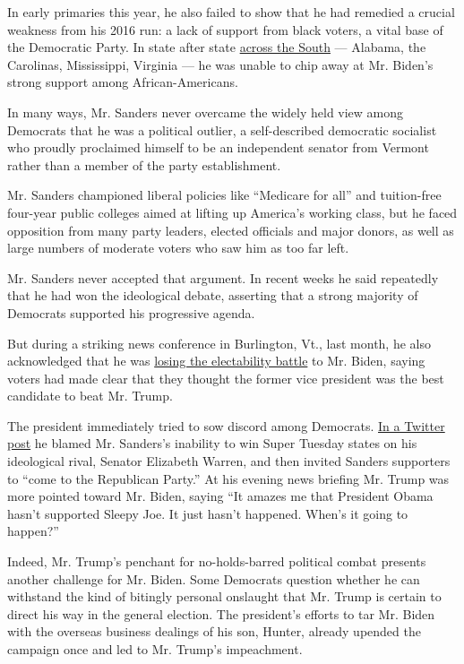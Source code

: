 In early primaries this year, he also failed to show that he had
remedied a crucial weakness from his 2016 run: a lack of support from
black voters, a vital base of the Democratic Party. In state after state
\href{https://www.nytimes.com/2020/03/04/us/politics/super-tuesday-virginia-voter-turnout.html}{across
the South} --- Alabama, the Carolinas, Mississippi, Virginia --- he was
unable to chip away at Mr. Biden's strong support among
African-Americans.

In many ways, Mr. Sanders never overcame the widely held view among
Democrats that he was a political outlier, a self-described democratic
socialist who proudly proclaimed himself to be an independent senator
from Vermont rather than a member of the party establishment.

Mr. Sanders championed liberal policies like ``Medicare for all'' and
tuition-free four-year public colleges aimed at lifting up America's
working class, but he faced opposition from many party leaders, elected
officials and major donors, as well as large numbers of moderate voters
who saw him as too far left.

Mr. Sanders never accepted that argument. In recent weeks he said
repeatedly that he had won the ideological debate, asserting that a
strong majority of Democrats supported his progressive agenda.

But during a striking news conference in Burlington, Vt., last month, he
also acknowledged that he was
\href{https://www.nytimes.com/2020/03/11/us/politics/bernie-sanders-democrats-2020.html}{losing
the electability battle} to Mr. Biden, saying voters had made clear that
they thought the former vice president was the best candidate to beat
Mr. Trump.

The president immediately tried to sow discord among Democrats.
\href{https://twitter.com/realDonaldTrump/status/1247914464319504385}{In
a Twitter post} he blamed Mr. Sanders's inability to win Super Tuesday
states on his ideological rival, Senator Elizabeth Warren, and then
invited Sanders supporters to ``come to the Republican Party.'' At his
evening news briefing Mr. Trump was more pointed toward Mr. Biden,
saying ``It amazes me that President Obama hasn't supported Sleepy Joe.
It just hasn't happened. When's it going to happen?''

Indeed, Mr. Trump's penchant for no-holds-barred political combat
presents another challenge for Mr. Biden. Some Democrats question
whether he can withstand the kind of bitingly personal onslaught that
Mr. Trump is certain to direct his way in the general election. The
president's efforts to tar Mr. Biden with the overseas business dealings
of his son, Hunter, already upended the campaign once and led to Mr.
Trump's impeachment.

